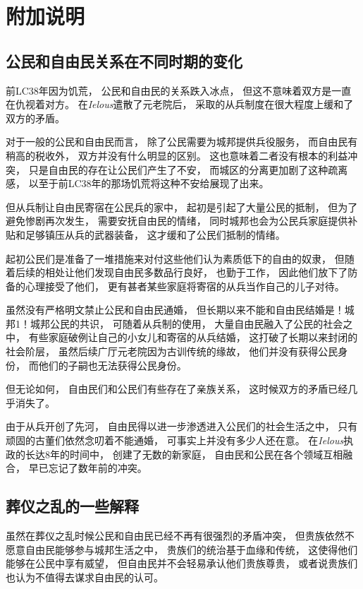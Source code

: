 \documentclass[12pt, a4paper]{ctexart}
\begin{document}
\section{附加说明}
    \subsection{公民和自由民关系在不同时期的变化}
        前LC38年因为饥荒，
        公民和自由民的关系跌入冰点，
        但这不意味着双方是一直在仇视着对方。
        在\emph{Ielous}遣散了元老院后，
        采取的从兵制度在很大程度上缓和了双方的矛盾。

        对于一般的公民和自由民而言，
        除了公民需要为城邦提供兵役服务，
        而自由民有稍高的税收外，
        双方并没有什么明显的区别。
        这也意味着二者没有根本的利益冲突，
        只是自由民的存在让公民们产生了不安，
        而城区的分离更加剧了这种疏离感，
        以至于前LC38年的那场饥荒将这种不安给展现了出来。

        但从兵制让自由民寄宿在公民兵的家中，
        起初是引起了大量公民的抵制，
        但为了避免惨剧再次发生，
        需要安抚自由民的情绪，
        同时城邦也会为公民兵家庭提供补贴和足够镇压从兵的武器装备，
        这才缓和了公民们抵制的情绪。

        起初公民们是准备了一堆措施来对付这些他们认为素质低下的自由的奴隶，
        但随着后续的相处让他们发现自由民多数品行良好，
        也勤于工作，
        因此他们放下了防备的心理接受了他们，
        更有甚者某些家庭将寄宿的从兵当作自己的儿子对待。

        虽然没有严格明文禁止公民和自由民通婚，
        但长期以来不能和自由民结婚是！城邦1！城邦公民的共识，
        可随着从兵制的使用，
        大量自由民融入了公民的社会之中，
        有些家庭破例让自己的小女儿和寄宿的从兵结婚，
        这打破了长期以来封闭的社会阶层，
        虽然后续广厅元老院因为古训传统的缘故，
        他们并没有获得公民身份，
        而他们的子嗣也无法获得公民身份。

        但无论如何，
        自由民们和公民们有些存在了亲族关系，
        这时候双方的矛盾已经几乎消失了。

        由于从兵开创了先河，
        自由民得以进一步渗透进入公民们的社会生活之中，
        只有顽固的古董们依然念叨着不能通婚，
        可事实上并没有多少人还在意。
        在\emph{Ielous}执政的长达8年的时间中，
        创建了无数的新家庭，
        自由民和公民在各个领域互相融合，
        早已忘记了数年前的冲突。
    \subsection{葬仪之乱的一些解释}
        虽然在葬仪之乱时候公民和自由民已经不再有很强烈的矛盾冲突，
        但贵族依然不愿意自由民能够参与城邦生活之中，
        贵族们的统治基于血缘和传统，
        这使得他们能够在公民中享有威望，
        但自由民并不会轻易承认他们贵族尊贵，
        或者说贵族们也认为不值得去谋求自由民的认可。
\end{document}
